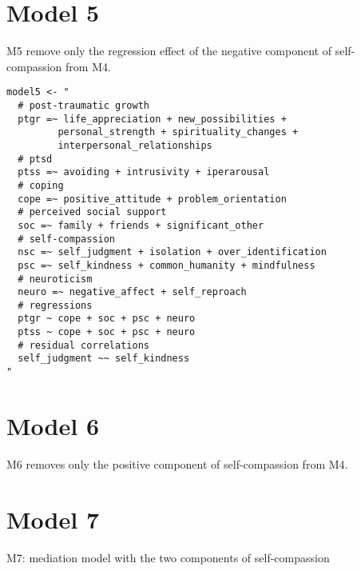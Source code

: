 \begin{appendix}
{\section{Model 5}\label{model-5}}

M5 remove only the regression effect of the negative component of
self-compassion from M4.

\begin{verbatim}
model5 <- "
  # post-traumatic growth
  ptgr =~ life_appreciation + new_possibilities + 
         personal_strength + spirituality_changes + 
         interpersonal_relationships
  # ptsd
  ptss =~ avoiding + intrusivity + iperarousal
  # coping
  cope =~ positive_attitude + problem_orientation 
  # perceived social support
  soc =~ family + friends + significant_other
  # self-compassion
  nsc =~ self_judgment + isolation + over_identification
  psc =~ self_kindness + common_humanity + mindfulness
  # neuroticism
  neuro =~ negative_affect + self_reproach
  # regressions
  ptgr ~ cope + soc + psc + neuro
  ptss ~ cope + soc + psc + neuro
  # residual correlations
  self_judgment ~~ self_kindness
"
\end{verbatim}

\newpage

\hypertarget{model-6}{%
\section{Model 6}\label{model-6}}

M6 removes only the positive component of self-compassion from M4.

\newpage

\hypertarget{model-7}{%
\section{Model 7}\label{model-7}}

M7: mediation model with the two components of self-compassion


\end{appendix}
